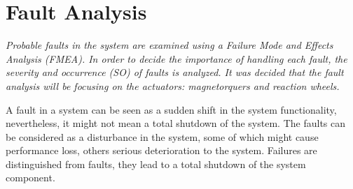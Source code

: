 \chapter{Fault  Analysis }
\textit{Probable faults in the system are examined using a  Failure Mode and Effects Analysis (FMEA). In order to decide the importance of handling each fault, the severity and occurrence (SO)  of faults is analyzed. It was decided that the fault analysis will be focusing on the actuators: magnetorquers and reaction wheels.}


A fault in a system can be seen as a sudden shift in the system functionality, nevertheless, it might not mean a total shutdown of the system. The faults can be considered as a disturbance in the system, some of which might cause performance loss, others serious deterioration to the system. Failures are distinguished from faults, they lead to a total shutdown of the system component. 

